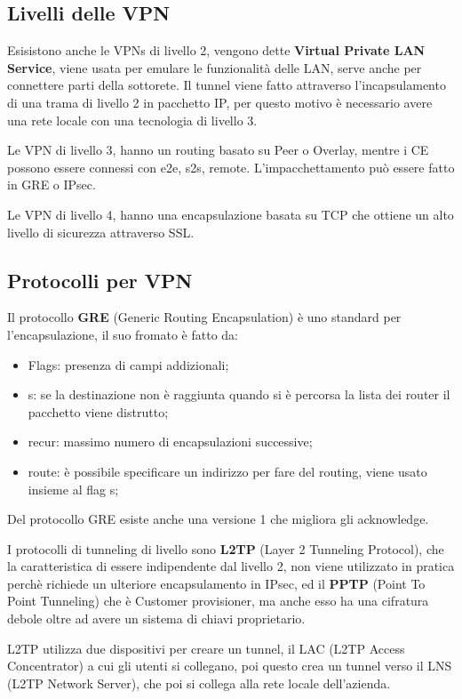 \documentclass[12pt]{article}
\begin{document}
\subsection{Livelli delle VPN}
Esisistono anche le VPNs di livello 2, vengono dette \textbf{Virtual Private LAN Service}, viene usata per emulare le funzionalit\`a delle LAN, serve anche per connettere parti della sottorete. Il tunnel viene fatto attraverso l'incapsulamento di una trama di livello 2 in pacchetto IP, per questo motivo \`e necessario avere una rete locale con una tecnologia di livello 3.

Le VPN di livello 3, hanno un routing basato su Peer o Overlay, mentre i CE possono essere connessi con e2e, s2s, remote. L'impacchettamento pu\`o essere fatto in GRE o IPsec.

Le VPN di livello 4, hanno una encapsulazione basata su TCP che ottiene un alto livello di sicurezza attraverso SSL.


\subsection{Protocolli per VPN}
Il protocollo \textbf{GRE} (Generic Routing Encapsulation) \`e uno standard per l'encapsulazione, il suo fromato \`e fatto da:
\begin{itemize}
    \item Flags: presenza di campi addizionali;
    \item s: se la destinazione non \`e raggiunta quando si \`e percorsa la lista dei router il pacchetto viene distrutto;
    \item recur: massimo numero di encapsulazioni successive;
    \item route: \`e possibile specificare un indirizzo per fare del routing, viene usato insieme al flag s;
\end{itemize}
Del protocollo GRE esiste anche una versione 1 che migliora gli acknowledge.

I protocolli di tunneling di livello sono \textbf{L2TP} (Layer 2 Tunneling Protocol), che la caratteristica di essere indipendente dal livello 2, non viene utilizzato in pratica perch\`e richiede un ulteriore encapsulamento in IPsec, ed il \textbf{PPTP} (Point To Point Tunneling) che \`e Customer provisioner, ma anche esso ha una cifratura debole oltre ad avere un sistema di chiavi proprietario.

L2TP utilizza due dispositivi per creare un tunnel, il LAC (L2TP Access Concentrator) a cui gli utenti si collegano, poi questo crea un tunnel verso il LNS (L2TP Network Server), che poi si collega alla rete locale dell'azienda.
\end{document}

